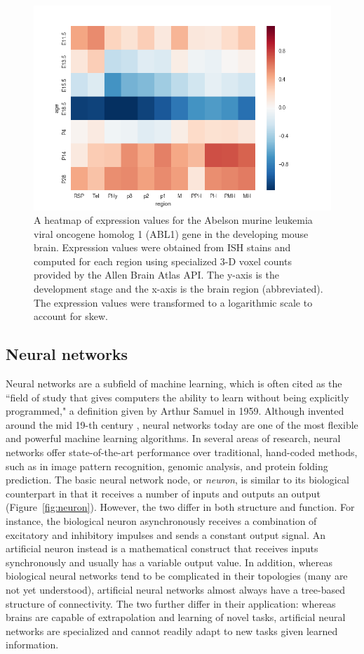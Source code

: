 \documentclass[12pt,oneside,onecolumn,a4paper]{article}
\begin{document}
\begin{figure}[h!]
\begin{center}
\includegraphics[width=0.8\columnwidth]{figures/Abl1/Abl1}
\caption{A heatmap of expression values for the Abelson murine leukemia viral oncogene homolog 1 (ABL1) gene in the developing mouse brain. Expression values were obtained from ISH stains and computed for each region using specialized 3-D voxel counts provided by the Allen Brain Atlas API. The y-axis is the development stage and the x-axis is the brain region (abbreviated). The expression values were transformed to a logarithmic scale to account for skew. \label{fig:matrix}%
}
\end{center}
\end{figure}

\subsection{Neural networks}
Neural networks are a subfield of machine learning, which is often cited as the ``field of study that gives computers the ability to learn without being
explicitly programmed," a definition given by Arthur Samuel in 1959. Although invented around the mid 19-th century \citep{Zilouchian2001FundamentalsON}, neural networks today are one of the most flexible and powerful machine learning algorithms. In several areas of research, neural networks offer state-of-the-art performance over traditional, hand-coded methods, such as in image pattern recognition, genomic analysis, and protein folding prediction. The basic neural network node, or \textit{neuron}, is similar to its biological counterpart in that it receives a number of inputs and outputs an output (Figure~\ref{fig:neuron}). However, the two differ in both structure and function. For instance, the biological neuron asynchronously receives a combination of excitatory and inhibitory impulses and sends a constant output signal. An artificial neuron instead is a mathematical construct that receives inputs synchronously and usually has a variable output value. In addition, whereas biological neural networks tend to be complicated in their topologies (many are not yet understood), artificial neural networks almost always have a tree-based structure of connectivity. The two further differ in their application: whereas brains are capable of extrapolation and learning of novel tasks, artificial neural networks are specialized and cannot readily adapt to new tasks given learned information.
\end{document}
